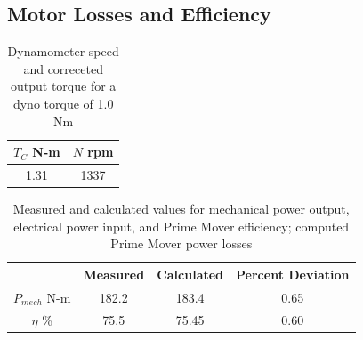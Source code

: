 \documentclass{article}
\begin{document}
\subsection{Motor Losses and Efficiency}

\begin{table}[H]
  \centering
  \begin{tabular}{*{2}{c}}
    $T_{C}$ N-m& $N$ rpm \\
    \hline
    1.31 & 1337  \\
  \end{tabular}
  \caption{Dynamometer speed and correceted output torque for a dyno torque of 1.0 Nm}
  \label{tab:table_04}
\end{table}

\begin{table}[H]
  \centering
  \begin{tabular}{*{4}{c}}
    & Measured & Calculated & Percent Deviation \\
    \hline
    $P_{mech}$ N-m & 182.2 & 183.4  & 0.65  \\
    $\eta$ \% & 75.5 & 75.45 & 0.60 \\
  \end{tabular}
  \caption{Measured and calculated values for mechanical power output,
    electrical power input, and Prime Mover efficiency; computed Prime Mover power losses}
  \label{tab:table_05}
\end{table}
\end{document}
